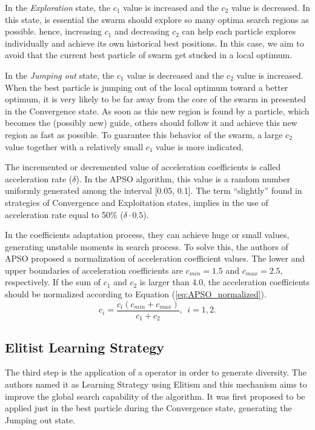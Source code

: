 In the \emph{Exploration} state, the $c_1$ value is increased and the $c_2$ value is decreased. In this state, is essential the swarm should explore so many optima search regions as possible. hence, increasing $c_1$ and decreasing $c_2$ can help each particle explores individually and achieve its own historical best positions. In this case, we aim to avoid that the current best particle of swarm get stucked in a local optimum.

In the \emph{Jumping out} state, the $c_1$ value is decreased and the $c_2$ value is increased. When the best particle is jumping out of the local optimum toward a better optimum, it is very likely to be far away from the core of the swarm in presented in the Convergence state. As soon as this new region is found by a particle, which becomes the (possibly new) guide, others should follow it and achieve this new region as fast as possible. To guarantee this behavior of the swarm, a large $c_2$ value together with a relatively small $c_1$ value is more indicated.

The incremented or decremented value of acceleration coefficients is called acceleration rate ($\delta$). In the APSO algorithm, this value is a random number uniformly generated  among the interval [0.05, 0.1]. The term ``slightly'' found in strategies of Convergence and Exploitation states, implies in the use of acceleration rate equal to 50\% ($\delta \cdot 0.5$).

In the coefficients adaptation process, they can achieve huge or small values, generating unstable moments in search process. To solve this, the authors of APSO proposed a normalization of acceleration coefficient values. The lower and upper boundaries of acceleration coefficients are $c_{min} = 1.5$ and $c_{max} = 2.5$, respectively. If the sum of $c_1$ and $c_2$ is larger than 4.0, the acceleration coefficients should be normalized according to Equation (\ref{eq:APSO_normalized}).
\begin{equation}\label{eq:APSO_normalized}
c_i = \frac{c_i(c_{min} + c_{max})}{c_1 + c_2}, \ \ i = 1,2.
\end{equation}

\subsection{Elitist Learning Strategy}
The third step is the application of a operator in order to generate diversity. The authors named it as Learning Strategy using Elitism and this mechanism aims to improve the global search capability of the algorithm. It was first proposed to be applied just in the best particle during the Convergence state, generating the Jumping out state.

